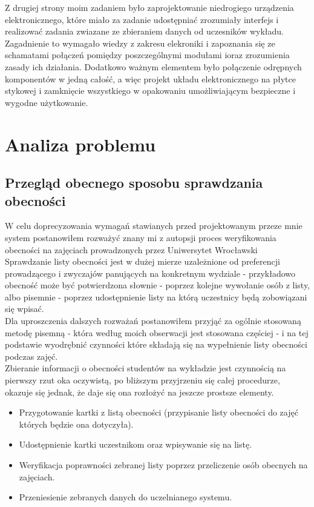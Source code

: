 \documentclass[declaration,shortabstract, mgr]{iithesis}
\begin{document}
\indent Z drugiej strony moim zadaniem było zaprojektowanie niedrogiego urządzenia elektronicznego, które miało za zadanie udostępniać zrozumiały interfejs i realizować zadania zwiazane ze zbieraniem danych od uczesników wykładu. Zagadnienie to wymagało wiedzy z zakresu elekroniki i zapoznania się ze schamatami połączeń pomiędzy poszczególnymi modułami ioraz zrozumienia zasady ich działania. Dodatkowo ważnym elementem było połączenie odrępnych komponentów w jedną całość, a więc projekt układu elektronicznego na płytce stykowej i zamknięcie wszystkiego w opakowaniu umożliwiającym bezpieczne i wygodne użytkowanie. 


\chapter{Analiza problemu}
\section{Przegląd obecnego sposobu sprawdzania obecności}
W celu doprecyzowania wymagań stawianych przed projektowanym przeze mnie system postanowiłem rozważyć znany mi z autopsji proces weryfikowania obecności na zajęciach prowadzonych przez Uniwersytet Wrocławski\\
\indent Sprawdzanie listy obecności jest w dużej mierze uzależnione od preferencji prowadzącego i zwyczajów panujących na konkretnym wydziale - przykładowo obecność może być potwierdzona słownie - poprzez kolejne wywołanie osób z listy, albo pisemnie - poprzez udostępnienie listy na którą uczestnicy będą zobowiązani się wpisać.\\
\indent Dla uproszczenia dalszych rozważań postanowiłem przyjąć za ogólnie stosowaną metodę pisemną - która według moich obserwacji jest stosowana częściej - i na tej podstawie wyodrębnić czynności które składają się na wypełnienie listy obecności podczas zajęć.\\
\indent Zbieranie informacji o obecności studentów na wykładzie jest czynnością na pierwszy rzut oka oczywistą, po bliższym przyjrzeniu się całej procedurze, okazuje się jednak, że daje się ona rozłożyć na jeszcze prostsze elementy. \\

\begin{itemize}
\item Przygotowanie kartki z listą obecności (przypisanie listy obecności do zajęć których będzie ona dotyczyła).
\item Udostępnienie kartki uczestnikom oraz wpisywanie się na listę.
\item Weryfikacja poprawności zebranej listy poprzez przeliczenie osób obecnych na zajęciach.
\item Przeniesienie zebranych danych do uczelnianego systemu.
\end{itemize}
\end{document}
